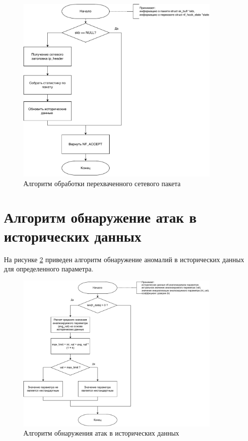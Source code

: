 \documentclass{bmstu}
\begin{document}
\begin{figure}[hbtp]
 \centering
 \includegraphics[width=0.9\textwidth]{inc/img/catch.pdf}
 \caption{Алгоритм обработки перехваченного сетевого пакета}
 \label{img:filter}
\end{figure}

\newpage
\section{Алгоритм обнаружение атак в исторических данных}
На рисунке \ref{img:anomaly} приведен алгоритм обнаружение аномалий в исторических данных для определенного параметра.

\begin{figure}[hbtp]
 \centering
 \includegraphics[width=0.9\textwidth]{inc/img/increase.pdf}
 \caption{Алгоритм обнаружения атак в исторических данных}
 \label{img:anomaly}
\end{figure}
\end{document}
